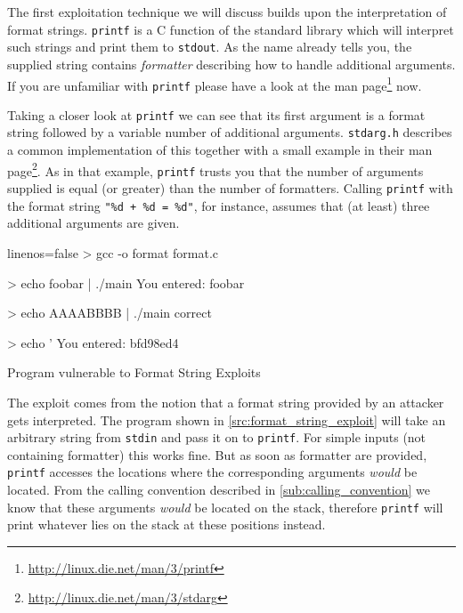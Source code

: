 \documentclass[article]{uibk}
\begin{document}
The first exploitation technique we will discuss builds upon the interpretation
of format strings. \texttt{printf} is a C function of the standard library
which will interpret such strings and print them to \texttt{stdout}. As the
name already tells you, the supplied string contains \textit{formatter}
describing how to handle additional arguments. If you are unfamiliar with
\texttt{printf} please have a look at the man
page\footnote{\url{http://linux.die.net/man/3/printf}} now.

Taking a closer look at \texttt{printf} we can see that its first argument is a
format string followed by a variable number of additional arguments.
\texttt{stdarg.h} describes a common implementation of this together with a
small example in their man
page\footnote{\url{http://linux.die.net/man/3/stdarg}}. As in that example,
\texttt{printf} trusts you that the number of arguments supplied is equal (or
greater) than the number of formatters. Calling \texttt{printf} with the format
string \texttt{"\%d + \%d = \%d"}, for instance, assumes that (at least) three
additional arguments are given.

\begin{listing}[h!]
    \begin{minipage}[t]{0.4\textwidth}
    \end{minipage}\hfill
    \begin{minipage}[t]{0.5\textwidth}
        \begin{code*}{linenos=false}
            > gcc -o format format.c


            > echo foobar | ./main
            You entered:
            foobar


            > echo AAAABBBB | ./main
            correct


            > echo '%
            You entered:
            bfd98ed4
        \end{code*}
    \end{minipage}
    \caption{Program vulnerable to Format String Exploits}
    \label{src:format_string_exploit}
\end{listing}

The exploit comes from the notion that a format string provided by an attacker
gets interpreted. The program shown in \cref{src:format_string_exploit} will
take an arbitrary string from \texttt{stdin} and pass it on to \texttt{printf}.
For simple inputs (not containing formatter) this works fine. But as soon as
formatter are provided, \texttt{printf} accesses the locations where the
corresponding arguments \emph{would} be located. From the calling convention
described in \cref{sub:calling_convention} we know that these arguments
\emph{would} be located on the stack, therefore \texttt{printf} will print
whatever lies on the stack at these positions instead.
\end{document}
